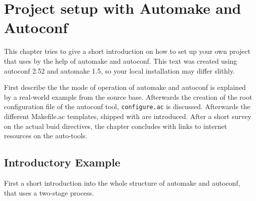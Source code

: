 \chapter{Project setup with Automake and Autoconf}
\label{sec:new_project}

This chapter tries to give a short introduction on how to set up your
own project that uses \miro by the help of automake and autoconf.
This text was created using autoconf 2.52 and automake 1.5, so your
local installation may differ slithly.

First describe the the mode of operation of automake and autoconf is
explained by a real-world example from the \miro source
base. Afterwards the creation of the root configuration file of the
autoconf tool, {\tt configure.ac} is discussed. Afterwards the
different Makefile.ac templates, shipped with \miro are
introduced. After a short survey on the actual buid directives, the
chapter concludes with links to internet resources on the auto-tools.

\section{Introductory Example}

First a short introduction into the whole structure of automake and
autoconf, that uses a two-stage process.

